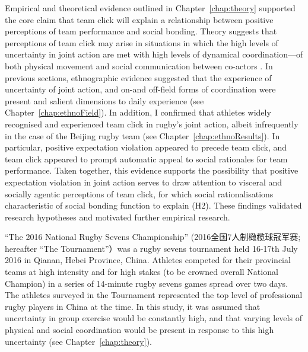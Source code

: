 \begin{CJK}{UTF8}{gbsn}
Empirical and theoretical evidence outlined in Chapter~\ref{chap:theory} supported the core claim that team click will explain a relationship between positive perceptions of team performance and social bonding.  Theory suggests that perceptions of team click may arise in situations in which the high levels of uncertainty in joint action are met with high levels of dynamical coordination---of both physical movement and social communication between co-actors \citep{Semin2008}.  In previous sections,  ethnographic evidence suggested that the experience of uncertainty of joint action, and on-and off-field forms of coordination were present and salient dimensions to daily experience (see Chapter~\ref{chap:ethnoField}).  In addition, I confirmed that athletes widely recognised and experienced team click in rugby’s joint action, albeit infrequently in the case of the Beijing rugby team (see Chapter~\ref{chap:ethnoResults}).  In particular, positive expectation violation appeared to precede team click,  and team click appeared to prompt automatic appeal to social rationales for team performance.  Taken together, this evidence supports the possibility that positive expectation violation in joint action serves to draw attention to visceral and socially agentic perceptions of team click, for which social rationalisations characteristic of social bonding function to explain (H2).   These findings validated research hypotheses and motivated further empirical research.

``The 2016 National Rugby Sevens Championship'' (2016全国7人制橄榄球冠军赛; hereafter ``The Tournament''）was a rugby sevens tournament held 16-17th July 2016 in Qianan, Hebei Province, China.  Athletes competed for their provincial teams at high intensity and for high stakes (to be crowned overall National Champion) in a series of 14-minute rugby sevens games spread over two days.  The athletes surveyed in the Tournament represented the top level of professional rugby players in China at the time.  In this study, it was assumed that uncertainty in group exercise would be constantly high, and that varying levels of physical and social coordination would be present in response to this high uncertainty (see Chapter~\ref{chap:theory}).


\end{CJK}
